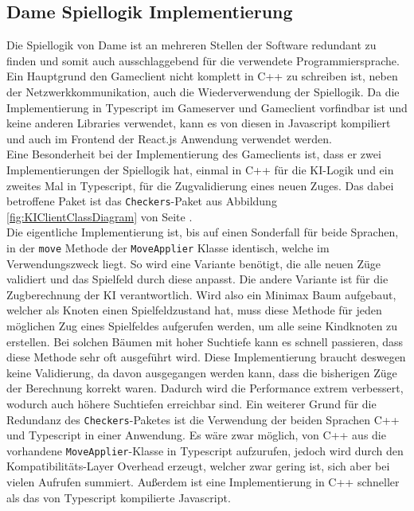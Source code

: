 \documentclass[12pt,a4paper,bibliography=totocnumbered,listof=totocnumbered]{article}
\begin{document}
\subsection{Dame Spiellogik Implementierung}
Die Spiellogik von Dame ist an mehreren Stellen der Software redundant zu finden und somit auch ausschlaggebend für die verwendete Programmiersprache.
Ein Hauptgrund den Gameclient nicht komplett in C++ zu schreiben ist, neben der Netzwerkkommunikation, auch die Wiederverwendung der Spiellogik.
Da die Implementierung in Typescript im Gameserver und Gameclient vorfindbar ist und keine anderen Libraries verwendet, kann es von diesen in Javascript kompiliert 
und auch im Frontend der React.js Anwendung verwendet werden.
\\
Eine Besonderheit bei der Implementierung des Gameclients ist, dass er zwei Implementierungen der Spiellogik hat, 
einmal in C++ für die \ac{KI}-Logik und ein zweites Mal in Typescript, für die Zugvalidierung eines neuen Zuges. 
Das dabei betroffene Paket ist das \texttt{Checkers}-Paket aus Abbildung \ref{fig:KIClientClassDiagram} von Seite \pageref{fig:KIClientClassDiagram}. 
\\
Die eigentliche Implementierung ist, bis auf einen Sonderfall für beide Sprachen, in der \texttt{move} Methode der \texttt{MoveApplier} Klasse identisch, 
welche im Verwendungszweck liegt. So wird eine Variante benötigt, die alle neuen Züge validiert und das Spielfeld durch diese anpasst. Die andere Variante ist für 
die Zugberechnung der \ac{KI} verantwortlich. Wird also ein Minimax Baum aufgebaut, welcher als Knoten einen Spielfeldzustand hat, muss diese Methode für jeden möglichen Zug eines 
Spielfeldes aufgerufen werden, um alle seine Kindknoten zu erstellen. Bei solchen Bäumen mit hoher Suchtiefe kann es schnell passieren, 
dass diese Methode sehr oft ausgeführt wird. Diese Implementierung braucht deswegen keine Validierung, da davon ausgegangen werden kann, dass die bisherigen Züge der 
Berechnung korrekt waren. Dadurch wird die Performance extrem verbessert, wodurch auch höhere Suchtiefen erreichbar sind.
Ein weiterer Grund für die Redundanz des \texttt{Checkers}-Paketes ist die Verwendung der beiden Sprachen C++ und Typescript in einer Anwendung. 
Es wäre zwar möglich, von C++ aus die vorhandene \texttt{MoveApplier}-Klasse in Typescript aufzurufen, jedoch wird durch den Kompatibilitäts-Layer Overhead erzeugt,
welcher zwar gering ist, sich aber bei vielen Aufrufen summiert. Außerdem ist eine Implementierung in C++ schneller als das von Typescript kompilierte Javascript.
\\
\end{document}
